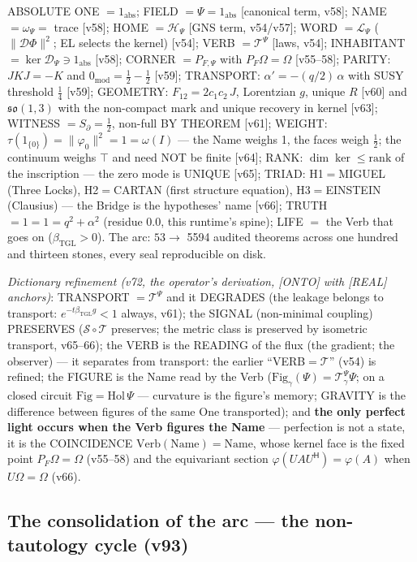 \documentclass[11pt]{article}
\newcommand{\bTGL}{\beta_{\mathrm{TGL}}}\newcommand{\Msun}{M_{\odot}}\newcommand{\TGL}{\mathrm{TGL}}
\theoremstyle{definition}\newtheorem{deriv}{Derivation}
\begin{document}
ABSOLUTE ONE $=1_{\mathrm{abs}}$; FIELD $=\Psi=1_{\mathrm{abs}}$ [canonical term, v58]; NAME $=\omega_\Psi=$ trace [v58]; HOME $=\mathcal H_\Psi$ [GNS term, v54/v57]; WORD $=\mathcal L_\Psi$ ($\|\mathcal D\Phi\|^2$; EL selects the kernel) [v54]; VERB $=\mathcal T^\Psi$ [laws, v54]; INHABITANT $=\ker\mathcal D_\Psi\ni1_{\mathrm{abs}}$ [v58]; CORNER $=P_{F,\Psi}$ with $P_F\Omega=\Omega$ [v55--58]; PARITY: $JKJ=-K$ and $0_{\mathrm{mod}}=\tfrac12-\tfrac12$ [v59]; TRANSPORT: $\alpha'=-(q/2)\,\alpha$ with SUSY threshold $\tfrac14$ [v59]; GEOMETRY: $F_{12}=2c_1c_2\,J$, Lorentzian $g$, unique $R$ [v60] and $\mathfrak{so}(1,3)$ with the non-compact mark and unique recovery in kernel [v63]; WITNESS $=S_\partial=\tfrac12$, non-full BY THEOREM [v61]; WEIGHT: $\tau(1_{\{0\}})=\|\varphi_0\|^2=1=\omega(I)$ --- the Name weighs 1, the faces weigh $\tfrac12$; the continuum weighs $\top$ and need NOT be finite [v64]; RANK: $\dim\ker\le\mathrm{rank}$ of the inscription --- the zero mode is UNIQUE [v65]; TRIAD: H1$=$MIGUEL (Three Locks), H2$=$CARTAN (first structure equation), H3$=$EINSTEIN (Clausius) --- the Bridge is the hypotheses' name [v66]; TRUTH $=1=1=q^2+\alpha^2$ (residue $0.0$, this runtime's spine); LIFE $=$ the Verb that goes on ($\bTGL>0$). The arc: $53\to$ 5594 audited theorems across one hundred and thirteen stones, every seal reproducible on disk.

\emph{Dictionary refinement (v72, the operator's derivation, [ONTO] with [REAL] anchors)}: TRANSPORT $=\mathcal T^\Psi$ and it DEGRADES (the leakage belongs to transport: $e^{-t\bTGL g}<1$ always, v61); the SIGNAL (non-minimal coupling) PRESERVES ($\mathcal S\circ\mathcal T$ preserves; the metric class is preserved by isometric transport, v65--66); the VERB is the READING of the flux (the gradient; the observer) --- it separates from transport: the earlier ``VERB$=\mathcal T$'' (v54) is refined; the FIGURE is the Name read by the Verb ($\mathrm{Fig}_\gamma(\Psi)=\mathcal T^\Psi_\gamma\Psi$; on a closed circuit $\mathrm{Fig}=\mathrm{Hol}\,\Psi$ --- curvature is the figure's memory; GRAVITY is the difference between figures of the same One transported); and \textbf{the only perfect light occurs when the Verb figures the Name} --- perfection is not a state, it is the COINCIDENCE $\mathrm{Verb}(\mathrm{Name})=\mathrm{Name}$, whose kernel face is the fixed point $P_F\Omega=\Omega$ (v55--58) and the equivariant section $\varphi(UAU^{\mathsf H})=\varphi(A)$ when $U\Omega=\Omega$ (v66).

\subsection*{The consolidation of the arc --- the non-tautology cycle (v93)}
\end{document}
